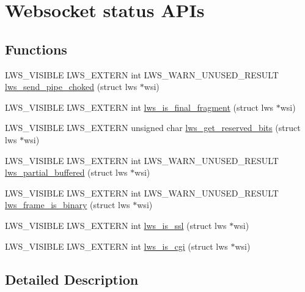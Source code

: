 \hypertarget{group__wsstatus}{}\section{Websocket status A\+P\+Is}
\label{group__wsstatus}
\subsection*{Functions}
\begin{DoxyCompactItemize}
\item 
L\+W\+S\+\_\+\+V\+I\+S\+I\+B\+LE L\+W\+S\+\_\+\+E\+X\+T\+E\+RN int L\+W\+S\+\_\+\+W\+A\+R\+N\+\_\+\+U\+N\+U\+S\+E\+D\+\_\+\+R\+E\+S\+U\+LT \hyperlink{group__wsstatus_ga2bb3655329b4651cd06f79ee3a764421}{lws\+\_\+send\+\_\+pipe\+\_\+choked} (struct lws $\ast$wsi)
\item 
L\+W\+S\+\_\+\+V\+I\+S\+I\+B\+LE L\+W\+S\+\_\+\+E\+X\+T\+E\+RN int \hyperlink{group__wsstatus_ga08e9ee165fca503fd9427d55cfecac37}{lws\+\_\+is\+\_\+final\+\_\+fragment} (struct lws $\ast$wsi)
\item 
L\+W\+S\+\_\+\+V\+I\+S\+I\+B\+LE L\+W\+S\+\_\+\+E\+X\+T\+E\+RN unsigned char \hyperlink{group__wsstatus_ga3df5045656dfb6b0e63a38de2dca79d2}{lws\+\_\+get\+\_\+reserved\+\_\+bits} (struct lws $\ast$wsi)
\item 
L\+W\+S\+\_\+\+V\+I\+S\+I\+B\+LE L\+W\+S\+\_\+\+E\+X\+T\+E\+RN int L\+W\+S\+\_\+\+W\+A\+R\+N\+\_\+\+U\+N\+U\+S\+E\+D\+\_\+\+R\+E\+S\+U\+LT \hyperlink{group__wsstatus_gaeca4afc94b1f026034f99cbba37e2f85}{lws\+\_\+partial\+\_\+buffered} (struct lws $\ast$wsi)
\item 
L\+W\+S\+\_\+\+V\+I\+S\+I\+B\+LE L\+W\+S\+\_\+\+E\+X\+T\+E\+RN int L\+W\+S\+\_\+\+W\+A\+R\+N\+\_\+\+U\+N\+U\+S\+E\+D\+\_\+\+R\+E\+S\+U\+LT \hyperlink{group__wsstatus_gaccd9c59336efad8af0554f79cc5966fd}{lws\+\_\+frame\+\_\+is\+\_\+binary} (struct lws $\ast$wsi)
\item 
L\+W\+S\+\_\+\+V\+I\+S\+I\+B\+LE L\+W\+S\+\_\+\+E\+X\+T\+E\+RN int \hyperlink{group__wsstatus_ga26a140623d202dd2bf2004deb6994baa}{lws\+\_\+is\+\_\+ssl} (struct lws $\ast$wsi)
\item 
L\+W\+S\+\_\+\+V\+I\+S\+I\+B\+LE L\+W\+S\+\_\+\+E\+X\+T\+E\+RN int \hyperlink{group__wsstatus_ga4ad226d5e01024b4046f4a5a37199aa1}{lws\+\_\+is\+\_\+cgi} (struct lws $\ast$wsi)
\end{DoxyCompactItemize}


\subsection{Detailed Description}
